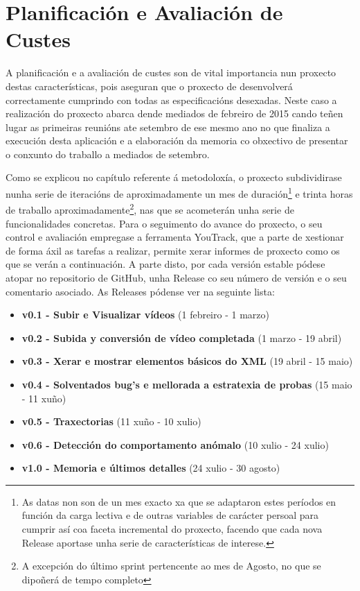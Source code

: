 \chapter{Planificación e Avaliación de Custes}

A planificación e a avaliación de custes son de vital importancia nun proxecto destas 
características, pois aseguran que o proxecto de desenvolverá correctamente cumprindo con todas as
especificacións desexadas. Neste caso a realización do proxecto abarca dende mediados de febreiro de
2015 cando teñen lugar as primeiras reunións ate setembro de ese mesmo ano no que finaliza a 
execución desta aplicación e a elaboración da memoria co obxectivo de presentar o conxunto do 
traballo a mediados de setembro.

Como se explicou no capítulo referente á metodoloxía, o proxecto subdividirase nunha serie de 
iteracións de aproximadamente un mes de duración\footnote{As datas non son de un mes exacto xa que
se adaptaron estes períodos en función da carga lectiva e de outras variables de carácter persoal 
para cumprir así coa faceta incremental do proxecto, facendo que cada nova Release aportase unha
serie de características de interese.} e trinta horas de traballo aproximadamente\footnote{ 
A excepción do último sprint pertencente ao mes de Agosto, no que se dipoñerá de tempo completo},
nas que se acometerán unha serie de 
funcionalidades concretas. Para o seguimento do avance do proxecto, o seu control e avaliación 
empregase a ferramenta YouTrack, que a parte de xestionar de forma áxil as tarefas a realizar, 
permite xerar informes de proxecto como os que se verán a continuación. A parte disto, por cada 
versión estable pódese atopar no repositorio de GitHub, unha Release co seu número de versión e o 
seu comentario asociado. As Releases pódense ver na seguinte lista:

\begin{itemize}
 \item \textbf{v0.1 - Subir e Visualizar vídeos} (1 febreiro - 1 marzo) 
 \item \textbf{v0.2 - Subida y conversión de vídeo completada} (1 marzo - 19 abril)
 \item \textbf{v0.3 - Xerar e mostrar elementos básicos do XML} (19 abril - 15 maio)
 \item \textbf{v0.4 - Solventados bug's e mellorada a estratexia de probas} (15 maio - 11 xuño)
 \item \textbf{v0.5 - Traxectorias}  (11 xuño - 10 xulio)
 \item \textbf{v0.6 - Detección do comportamento anómalo} (10 xulio - 24 xulio)
 \item \textbf{v1.0 - Memoria e últimos detalles} (24 xulio - 30 agosto)
\end{itemize}

